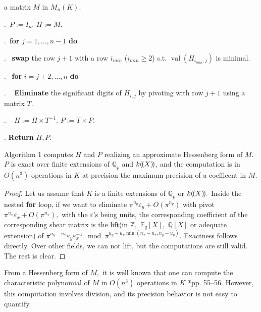 \documentclass{sig-alternate-05-2015}
\DeclareMathOperator{\val}{val}
\newcommand{\llp}{(\mkern-2.5mu(}
\newcommand{\rrp}{)\mkern-2.5mu)}
\begin{document}
 a matrix $M$ in $M_n(K).$

\smallskip

.\ $P:=I_n.$ \: $H:=M.$


.\ {\bf for} $j=1,\dots,n-1$ {\bf do} 

.\  \:  {\bf swap} the row $j+1$ with a row $i_{min}$ ($i_{min} \geq 2$) s.t. $\val(H_{i_{min},j})$ is minimal. 

.\  \:  {\bf for} $i=j+2,\dots,n$ {\bf do} 

. \ \: \:  \textbf{Eliminate} the significant digits of $H_{i,j}$ by pivoting with row $j+1$ 
using a matrix $T.$

. \ \: \:  $H:=H \times T^{-1}.$ \: $P:=T \times P.$

. \textbf{Return} $H,P.$

\vspace{-1ex}\noindent\hrulefill

\medskip



\begin{prop} 
Algorithm 1 computes $H$ and $P$ realizing an approximate Hessenberg form of $M.$
$P$ is exact over finite extensions of $\mathbb{Q}_p$ and $k\llp X\rrp$, and the computation is in $O(n^3)$ operations in $K$ at precision the maximum precision of a coefficent in $M.$
\end{prop}
\begin{proof}
Let us assume that $K$ is a finite extensions of $\mathbb{Q}_p$ or $k\llp X \rrp.$
Inside the nested \textbf{for} loop, if we want to eliminate $\pi^{u_y} \varepsilon_y+O(\pi^{n_y})$ with pivot $\pi^{u_x} \varepsilon_x+O(\pi^{n_x}),$
with the $\varepsilon$'s being units,
the corresponding coefficient of the corresponding shear matrix is the lift(in $\mathbb{Z}, $  $\mathbb{F}_q[X],$ $\mathbb{Q}[X]$ or adequate extension) of $\pi^{u_y-u_x} \varepsilon_y \varepsilon_x^{-1} \mod \pi^{u_y-u_x\min (n_x-u_x,n_y-u_y)}.$
Exactness follows directly. Over other fields, we can not lift, but the computations are still valid.
The rest is clear.
\end{proof}

\begin{rem} \label{rem:char_pol_from_hessenberg}
From a Hessenberg form of $M,$ it is well known
that one can compute the characteristic polynomial of 
$M$ in $O(n^3)$ operations in $K$ \cite{Cohen:2013}*{pp. 55--56}.
However, this computation involves division, and its
precision behavior is not easy to quantify.
\end{rem}
\end{document}
